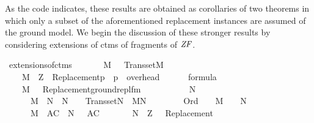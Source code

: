 As the code indicates, these results are obtained as corollaries of
two theorems in which only a subset of the aforementioned
replacement instances are assumed of the ground model. We begin the
discussion of these stronger results by
considering extensions of ctms of fragments of $\mathit{ZF}$.
\begin{isabelle}
\isamarkupfalse%
\ extensions{\isacharunderscore}{\kern0pt}of{\isacharunderscore}{\kern0pt}ctms{\isacharcolon}{\kern0pt}\isanewline
\ \ \isanewline
\ \ \ \ {\isachardoublequoteopen}M\ {\isasymapprox}\ {\isasymomega}{\isachardoublequoteclose}\ {\isachardoublequoteopen}Transset{\isacharparenleft}{\kern0pt}M{\isacharparenright}{\kern0pt}{\isachardoublequoteclose}\isanewline
\ \ \ \ {\isachardoublequoteopen}M\ {\isasymTurnstile}\ {\isasymcdot}Z{\isasymcdot}\ {\isasymunion}\ {\isacharbraceleft}{\kern0pt}{\isasymcdot}Replacement{\isacharparenleft}{\kern0pt}p{\isacharparenright}{\kern0pt}{\isasymcdot}\ {\isachardot}{\kern0pt}\ p\ {\isasymin}\ overhead{\isacharbraceright}{\kern0pt}{\isachardoublequoteclose}\isanewline
\ \ \ \ {\isachardoublequoteopen}{\isasymPhi}\ {\isasymsubseteq}\ formula{\isachardoublequoteclose}\isanewline%
\ \ \ \ {\isachardoublequoteopen}M\ {\isasymTurnstile}\ {\isacharbraceleft}{\kern0pt}\ {\isasymcdot}Replacement{\isacharparenleft}{\kern0pt}ground{\isacharunderscore}{\kern0pt}repl{\isacharunderscore}{\kern0pt}fm{\isacharparenleft}{\kern0pt}{\isasymphi}{\isacharparenright}{\kern0pt}{\isacharparenright}{\kern0pt}{\isasymcdot}\ {\isachardot}{\kern0pt}\ {\isasymphi}\ {\isasymin}\ {\isasymPhi}{\isacharbraceright}{\kern0pt}{\isachardoublequoteclose}\isanewline
\ \ \isanewline
\ \ \ \ {\isachardoublequoteopen}{\isasymexists}N{\isachardot}{\kern0pt}\isanewline
\ \ \ \ \ \ M\ {\isasymsubseteq}\ N\ {\isasymand}\ N\ {\isasymapprox}\ {\isasymomega}\ {\isasymand}\ Transset{\isacharparenleft}{\kern0pt}N{\isacharparenright}{\kern0pt}\ {\isasymand}\ M{\isasymnoteq}N\ {\isasymand}\isanewline
\ \ \ \ \ \ {\isacharparenleft}{\kern0pt}{\isasymforall}{\isasymalpha}{\isachardot}{\kern0pt}\ Ord{\isacharparenleft}{\kern0pt}{\isasymalpha}{\isacharparenright}{\kern0pt}\ {\isasymlongrightarrow}\ {\isacharparenleft}{\kern0pt}{\isasymalpha}\ {\isasymin}\ M\ {\isasymlongleftrightarrow}\ {\isasymalpha}\ {\isasymin}\ N{\isacharparenright}{\kern0pt}{\isacharparenright}{\kern0pt}\ {\isasymand}\isanewline
\ \ \ \ \ \ {\isacharparenleft}{\kern0pt}{\isacharparenleft}{\kern0pt}M{\isacharcomma}{\kern0pt}\ {\isacharbrackleft}{\kern0pt}{\isacharbrackright}{\kern0pt}{\isasymTurnstile}\ {\isasymcdot}AC{\isasymcdot}{\isacharparenright}{\kern0pt}\ {\isasymlongrightarrow}\ N{\isacharcomma}{\kern0pt}\ {\isacharbrackleft}{\kern0pt}{\isacharbrackright}{\kern0pt}\ {\isasymTurnstile}\ {\isasymcdot}AC{\isasymcdot}{\isacharparenright}{\kern0pt}\ {\isasymand}\isanewline
\ \ \ \ \ \ N\ {\isasymTurnstile}\ {\isasymcdot}Z{\isasymcdot}\ {\isasymunion}\ {\isacharbraceleft}{\kern0pt}\ {\isasymcdot}Replacement{\isacharparenleft}{\kern0pt}{\isasymphi}{\isacharparenright}{\kern0pt}{\isasymcdot}\ {\isachardot}{\kern0pt}\ {\isasymphi}\ {\isasymin}\ {\isasymPhi}{\isacharbraceright}{\kern0pt}{\isachardoublequoteclose}
\end{isabelle}

